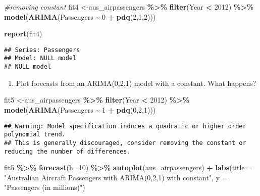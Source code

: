 \documentclass[
]{article}
\newenvironment{Shaded}{\begin{snugshade}}{\end{snugshade}}
\newcommand{\AttributeTok}[1]{\textcolor[rgb]{0.13,0.29,0.53}{#1}}
\newcommand{\CommentTok}[1]{\textcolor[rgb]{0.56,0.35,0.01}{\textit{#1}}}
\newcommand{\DecValTok}[1]{\textcolor[rgb]{0.00,0.00,0.81}{#1}}
\newcommand{\FunctionTok}[1]{\textcolor[rgb]{0.13,0.29,0.53}{\textbf{#1}}}
\newcommand{\NormalTok}[1]{#1}
\newcommand{\OtherTok}[1]{\textcolor[rgb]{0.56,0.35,0.01}{#1}}
\newcommand{\SpecialCharTok}[1]{\textcolor[rgb]{0.81,0.36,0.00}{\textbf{#1}}}
\newcommand{\StringTok}[1]{\textcolor[rgb]{0.31,0.60,0.02}{#1}}
\providecommand{\tightlist}{%
  \setlength{\itemsep}{0pt}\setlength{\parskip}{0pt}}
\begin{document}
\begin{Shaded}
\begin{Highlighting}[]
\CommentTok{\#removing constant}
\NormalTok{fit4 }\OtherTok{\textless{}{-}}\NormalTok{aus\_airpassengers }\SpecialCharTok{\%\textgreater{}\%}
  \FunctionTok{filter}\NormalTok{(Year }\SpecialCharTok{\textless{}} \DecValTok{2012}\NormalTok{) }\SpecialCharTok{\%\textgreater{}\%}
  \FunctionTok{model}\NormalTok{(}\FunctionTok{ARIMA}\NormalTok{(Passengers }\SpecialCharTok{\textasciitilde{}} \DecValTok{0} \SpecialCharTok{+} \FunctionTok{pdq}\NormalTok{(}\DecValTok{2}\NormalTok{,}\DecValTok{1}\NormalTok{,}\DecValTok{2}\NormalTok{)))}

\FunctionTok{report}\NormalTok{(fit4)}
\end{Highlighting}
\end{Shaded}

\begin{verbatim}
## Series: Passengers 
## Model: NULL model 
## NULL model
\end{verbatim}

\begin{enumerate}
\def\labelenumi{\alph{enumi}.}
\setcounter{enumi}{4}
\tightlist
\item
  Plot forecasts from an ARIMA(0,2,1) model with a constant. What
  happens?
\end{enumerate}

\begin{Shaded}
\begin{Highlighting}[]
\NormalTok{fit5 }\OtherTok{\textless{}{-}}\NormalTok{aus\_airpassengers }\SpecialCharTok{\%\textgreater{}\%}
  \FunctionTok{filter}\NormalTok{(Year }\SpecialCharTok{\textless{}} \DecValTok{2012}\NormalTok{) }\SpecialCharTok{\%\textgreater{}\%}
  \FunctionTok{model}\NormalTok{(}\FunctionTok{ARIMA}\NormalTok{(Passengers }\SpecialCharTok{\textasciitilde{}} \DecValTok{1} \SpecialCharTok{+} \FunctionTok{pdq}\NormalTok{(}\DecValTok{0}\NormalTok{,}\DecValTok{2}\NormalTok{,}\DecValTok{1}\NormalTok{)))}
\end{Highlighting}
\end{Shaded}

\begin{verbatim}
## Warning: Model specification induces a quadratic or higher order polynomial trend. 
## This is generally discouraged, consider removing the constant or reducing the number of differences.
\end{verbatim}

\begin{Shaded}
\begin{Highlighting}[]
\NormalTok{fit5 }\SpecialCharTok{\%\textgreater{}\%} 
  \FunctionTok{forecast}\NormalTok{(}\AttributeTok{h=}\DecValTok{10}\NormalTok{) }\SpecialCharTok{\%\textgreater{}\%}
  \FunctionTok{autoplot}\NormalTok{(aus\_airpassengers) }\SpecialCharTok{+}
  \FunctionTok{labs}\NormalTok{(}\AttributeTok{title =} \StringTok{"Australian Aircraft Passengers with ARIMA(0,2,1) with constant"}\NormalTok{, }\AttributeTok{y =} \StringTok{"Passengers (in millions)"}\NormalTok{)}
\end{Highlighting}
\end{Shaded}
\end{document}
